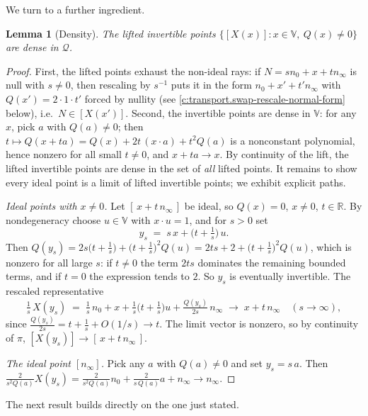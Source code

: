 \documentclass[11pt]{article}
\newtheorem{lemma}[theorem]{Lemma}
\theoremstyle{definition}
\theoremstyle{plain}
\providecommand{\R}{}\renewcommand{\R}{\mathbb{R}}
\providecommand{\nInf}{}\renewcommand{\nInf}{n_\infty}
\providecommand{\nO}{}\renewcommand{\nO}{n_0}
\begin{document}
We turn to a further ingredient.

\begin{lemma}[Density]\label{c:transport.density}
The lifted invertible points $\{[X(x)] : x \in \mathbb{V},\ Q(x) \neq 0\}$ are dense in $\mathcal{Q}$.
\end{lemma}
\begin{proof}
First, the lifted points exhaust the non-ideal rays: if $N = s\nO + x + t\nInf$ is null with $s \neq 0$, then rescaling by $s^{-1}$ puts it in the form $\nO + x' + t'\nInf$ with $Q(x') = 2 \cdot 1 \cdot t'$ forced by nullity (see \ref{c:transport.swap-rescale-normal-form} below), i.e.\ $N \in [X(x')]$. Second, the invertible points are dense in $\mathbb{V}$: for any $x$, pick $a$ with $Q(a) \neq 0$; then $t \mapsto Q(x + ta) = Q(x) + 2t\,(x \cdot a) + t^2 Q(a)$ is a nonconstant polynomial, hence nonzero for all small $t \neq 0$, and $x + ta \to x$. By continuity of the lift, the lifted invertible points are dense in the set of \emph{all} lifted points. It remains to show every ideal point is a limit of lifted invertible points; we exhibit explicit paths.

\emph{Ideal points with $x \neq 0$.} Let $[\,x + t\,\nInf\,]$ be ideal, so $Q(x) = 0$, $x \neq 0$, $t \in \R$. By nondegeneracy choose $u \in \mathbb{V}$ with $x \cdot u = 1$, and for $s > 0$ set
\[
y_s \;=\; s\,x + \bigl(t + \tfrac{1}{s}\bigr)\,u .
\]
Then $Q(y_s) = 2s\bigl(t + \tfrac1s\bigr) + \bigl(t + \tfrac1s\bigr)^2 Q(u) = 2ts + 2 + \bigl(t + \tfrac1s\bigr)^2 Q(u)$, which is nonzero for all large $s$: if $t \neq 0$ the term $2ts$ dominates the remaining bounded terms, and if $t = 0$ the expression tends to $2$. So $y_s$ is eventually invertible. The rescaled representative
\[
\tfrac{1}{s}\,X(y_s) \;=\; \tfrac{1}{s}\,\nO + x + \tfrac{1}{s}\bigl(t + \tfrac1s\bigr)u + \tfrac{Q(y_s)}{2s}\,\nInf
\;\longrightarrow\; x + t\,\nInf \quad (s \to \infty),
\]
since $\tfrac{Q(y_s)}{2s} = t + \tfrac1s + O(1/s) \to t$. The limit vector is nonzero, so by continuity of $\pi$, $[X(y_s)] \to [\,x + t\,\nInf\,]$.

\emph{The ideal point $[\nInf]$.} Pick any $a$ with $Q(a) \neq 0$ and set $y_s = s\,a$. Then $\tfrac{2}{s^2 Q(a)} X(y_s) = \tfrac{2}{s^2 Q(a)} \nO + \tfrac{2}{s\,Q(a)}a + \nInf \to \nInf$.

\end{proof}

The next result builds directly on the one just stated.
\end{document}
